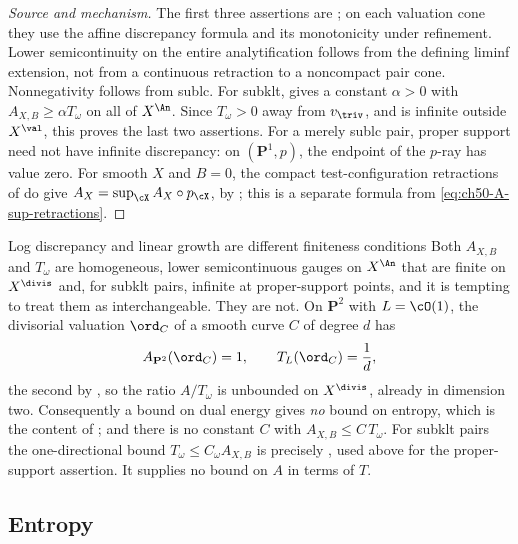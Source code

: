 \begin{proof}[Source and mechanism]
The first three assertions are
\cite[Propositions~A.3--A.4 and Definition~A.5]{BJKS2};
on each valuation cone they use the affine discrepancy formula and its
monotonicity under refinement.  Lower semicontinuity on the entire
analytification follows from the defining liminf extension, not from a
continuous retraction to a noncompact pair cone.  Nonnegativity follows
from sublc.  For subklt, \cite[Theorem~A.6]{BJKS2} gives a constant
$\alpha>0$ with $A_{X,B}\ge\alpha T_\omega$ on all of $X^{\An}$.
Since $T_\omega>0$ away from $v_{\triv}$, and is infinite outside
$X^{\val}$, this proves the last two assertions.
For a merely sublc pair, proper support need not have infinite discrepancy:
on $(\mathbf P^1,p)$, the endpoint of the $p$-ray has value zero.
For smooth $X$ and $B=0$, the compact test-configuration retractions
of  do give
$A_X=\sup_\cX A_X\circ p_\cX$, by
\cite[Theorem~A.10]{BJKS2}; this is a separate formula from
\eqref{eq:ch50-A-sup-retractions}.
\end{proof}

\par\noindent\begin{minipage}{\textwidth}
\begin{warning}{Log discrepancy and linear growth are different finiteness
conditions}
\label{warn:ch50-A-vs-T}
Both $A_{X,B}$ and $T_\omega$ are homogeneous, lower semicontinuous
gauges on $X^{\An}$ that are finite on $X^{\divis}$ and, for
subklt pairs, infinite at proper-support points, and it is tempting to treat them as
interchangeable.  They are not.  On $\mathbf P^2$ with $L=\cO(1)$, the
divisorial valuation $\ord_{C}$ of a smooth curve $C$ of degree $d$
has
\[
 A_{\mathbf P^2}(\ord_C)=1,
 \qquad
 T_L(\ord_C)=\frac1d,
\]
the second by , so the ratio
$A/T_\omega$ is unbounded on $X^{\divis}$, already in dimension two.
Consequently a bound on dual energy gives \emph{no} bound on entropy, which
is the content of ; and there is no constant
$C$ with $A_{X,B}\le C\,T_\omega$.  For subklt pairs the one-directional bound
$T_\omega\le C_\omega A_{X,B}$ is precisely
\cite[Theorem~A.6]{BJKS2}, used above for the proper-support assertion.
It supplies no bound on $A$ in terms of $T$.
\end{warning}
\end{minipage}\par\medskip

\subsection{Entropy}
\label{sec:ch50-entropy-def}


